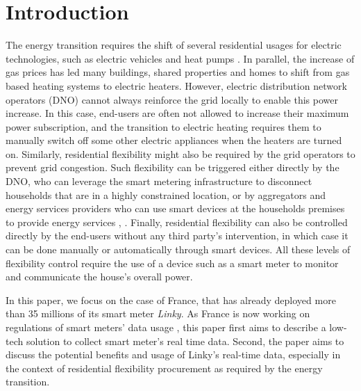 \documentclass[conference]{IEEEtran}
\begin{document}
	\section{Introduction}
	The energy transition requires the shift of several residential usages for electric technologies, such as electric vehicles and heat pumps
	\cite{RTEScenario:techrep}. In parallel, the increase of gas prices has led many buildings, shared properties and homes to shift from gas based heating systems to electric heaters. However,   electric distribution  network operators (DNO) cannot always  reinforce the grid locally to enable this power increase.
	In this case, end-users are often not allowed to increase their maximum power subscription, and the transition to electric heating requires them to manually switch off some other electric appliances when the heaters are turned on. 
	Similarly, residential flexibility might also be required by the grid operators to prevent grid congestion.
	Such flexibility can be triggered either directly by the DNO, who can leverage the smart metering infrastructure to disconnect  households that are in a highly constrained location, or by aggregators and energy services providers who can use smart devices at the households premises to provide energy services  \cite{voltalis:website}, \cite{chargeangels:website}. Finally, residential flexibility can also be controlled directly by the end-users without any third party's intervention, in which case it can be done manually or automatically through smart devices. All these levels of flexibility control require the use of a device such as a smart meter to monitor and communicate the house's overall power. 
	
	In this paper, we focus on the case of France, that has already deployed more than 35 millions of its smart meter \textit{Linky}.
	As France is now working on regulations of smart meters' data usage \cite{cre:website}, this paper first aims to describe a low-tech solution to collect smart meter's real time data. Second, the paper aims to discuss the potential benefits and usage of Linky's real-time data, especially in the context of residential flexibility procurement as required by the energy transition. 
	
\end{document}
